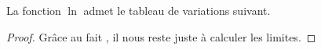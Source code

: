 \begin{fact} \label{ln-rab-var}
	La fonction $\ln$ admet le tableau de variations suivant.
	\begin{center}
	\end{center}
\end{fact}


\begin{proof}
	Grâce au fait , il nous reste juste à calculer les limites.
\end{proof}
